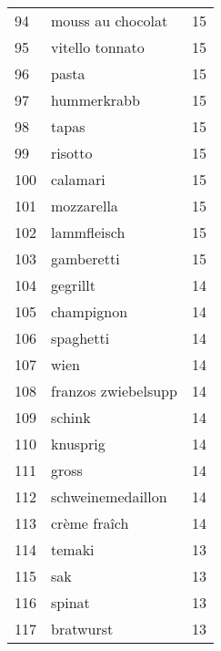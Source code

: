 \begin{tabular}{llr}
94   &                                  mouss au chocolat &     15 \\
95   &                                    vitello tonnato &     15 \\
96   &                                              pasta &     15 \\
97   &                                        hummerkrabb &     15 \\
98   &                                              tapas &     15 \\
99   &                                            risotto &     15 \\
100  &                                           calamari &     15 \\
101  &                                         mozzarella &     15 \\
102  &                                        lammfleisch &     15 \\
103  &                                         gamberetti &     15 \\
104  &                                           gegrillt &     14 \\
105  &                                         champignon &     14 \\
106  &                                          spaghetti &     14 \\
107  &                                               wien &     14 \\
108  &                                franzos zwiebelsupp &     14 \\
109  &                                             schink &     14 \\
110  &                                           knusprig &     14 \\
111  &                                              gross &     14 \\
112  &                                  schweinemedaillon &     14 \\
113  &                                       crème fraîch &     14 \\
114  &                                             temaki &     13 \\
115  &                                                sak &     13 \\
116  &                                             spinat &     13 \\
117  &                                          bratwurst &     13 \\

\end{tabular}
